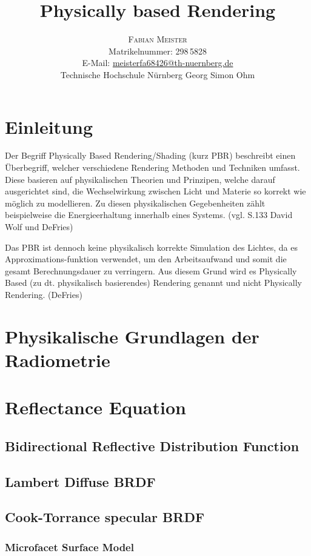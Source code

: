 \documentclass[
  11pt,
  a4paper,
  oneside
  ]{article}
\title{Physically based Rendering} %
\author{%
\textsc{Fabian Meister} \\[1ex] %
\normalsize Matrikelnummer: 298\,5828 \\ %
\normalsize E-Mail: \href{mailto:meisterfa68426@th-nuernberg.de}{meisterfa68426@th-nuernberg.de} \\%
\normalsize Technische Hochschule Nürnberg Georg Simon Ohm \\ %
}
\date{} %
\begin{document}
\maketitle


\section{Einleitung}

Der Begriff Physically Based Rendering/Shading (kurz PBR) beschreibt einen Über\-begriff, welcher verschiedene Rendering Methoden und Techniken umfasst. Diese basieren auf physikalischen Theorien und Prinzipen, welche darauf ausgerichtet sind, die Wechselwirkung zwischen Licht und Materie so korrekt wie möglich zu modellieren. Zu diesen physikalischen Gegebenheiten zählt beispielweise die Energieerhaltung innerhalb eines Systems. (vgl. S.133 David Wolf und DeFries) 

Das PBR ist dennoch keine physikalisch korrekte Simulation des Lichtes, da es Approximations-funktion verwendet, um den Arbeitsaufwand und somit die gesamt Berechnungsdauer zu verringern. Aus diesem Grund wird es Physically Based (zu dt. physikalisch basierendes) Rendering genannt und nicht Physically Rendering. (DeFries)
\section{Physikalische Grundlagen der Radiometrie}
\section{Reflectance Equation}
\subsection{Bidirectional Reflective Distribution Function}
\subsection{Lambert Diffuse BRDF}
\subsection{Cook-Torrance specular BRDF}
\subsubsection{Microfacet Surface Model}
\end{document}
